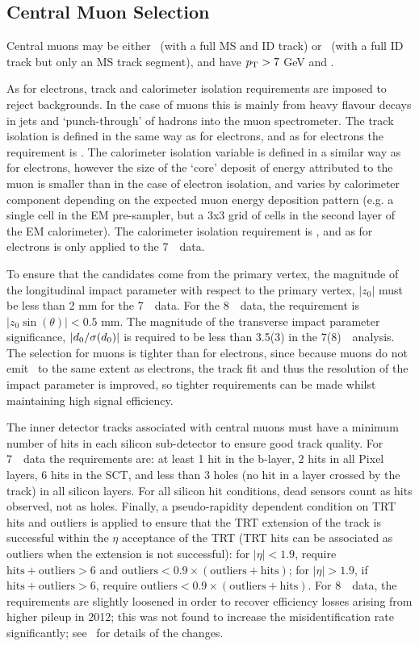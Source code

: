 \subsection{Central Muon Selection}

Central muons may be either \combined\ (with a full MS and ID track) or
\segmentTagged\ (with a full ID track but only an MS track segment), and have $p_{\mathrm{T}}>7$ GeV
and .

As for electrons, track and calorimeter isolation requirements are imposed to
reject backgrounds. In the case of muons this is mainly from heavy flavour
decays in jets and `punch-through' of hadrons into the muon spectrometer.  The
track isolation is defined in the same way as for electrons, and as for
electrons the requirement
is .  The calorimeter isolation variable is defined in a
similar way as for electrons, however the size of the `core' deposit of energy
attributed to the muon is smaller than in the case of electron isolation, and
varies by calorimeter component depending on the expected muon energy deposition
pattern (e.g. a single cell in the EM pre-sampler, but a 3x3 grid of cells in the second
layer of the EM calorimeter). The calorimeter isolation requirement is
, and as for electrons is only applied to the 7~\tev\ data.

To ensure that the candidates come from the primary vertex, the magnitude of the
longitudinal impact parameter with respect to the primary vertex, $|z_0|$ must
be less than 2 mm for the 7~\tev\ data. For the 8~\tev\ data, the requirement is
$|z_0\sin(\theta)|<0.5$ mm. The magnitude of the transverse impact parameter
significance, $|d_{0} / \sigma (d_{0} )|$ is required to be less than 3.5(3) in the 7(8)~\tev\
analysis. The selection for muons is tighter than for electrons, since because
muons do not emit \brem\ to the same extent as electrons, the track fit and thus
the resolution of the impact parameter is improved, so tighter requirements can
be made whilst maintaining high signal efficiency.

The inner detector tracks associated with central muons must have a minimum
number of hits in each silicon sub-detector to ensure good track quality. For
7~\tev\ data the requirements are: at least 1 hit in the b-layer, $2$ hits in all Pixel
layers, $6$ hits in the SCT, and less than 3 holes (no hit in a layer crossed by the
track) in all silicon layers. For all silicon hit conditions, dead sensors count
as hits observed, not as holes.  Finally, a pseudo-rapidity dependent condition
on TRT hits and outliers is applied to ensure that the TRT extension of the
track is successful within the $\eta$ acceptance of the TRT (TRT hits can be
associated as outliers when the extension is not successful): for $|\eta| <
1.9$, require $\mathrm{hits}+\mathrm{outliers} > 6$ and $\mathrm{outliers} < 0.9
\times (\mathrm{outliers}+\mathrm{hits})$; for $|\eta| > 1.9$, if
$\mathrm{hits}+\mathrm{outliers} > 6$, require $\mathrm{outliers} < 0.9 \times
(\mathrm{outliers}+\mathrm{hits})$. For 8~\tev\ data, the
requirements are slightly loosened in order to recover efficiency losses arising
from higher pileup in 2012; this was not found to increase the misidentification rate significantly;
see~\tab{objsel-mu} for details of the changes.



